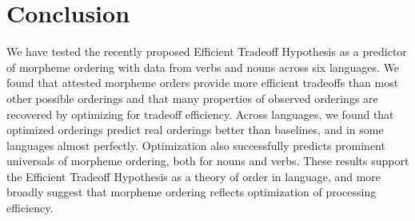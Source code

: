 \documentclass[man]{apa7}
\begin{document}
\section{Conclusion}

We have tested the recently proposed Efficient Tradeoff Hypothesis as a predictor of morpheme ordering with data from verbs and nouns across six languages.
We found that attested morpheme orders provide more efficient tradeoffs than most other possible orderings and that many properties of observed orderings are recovered by optimizing for tradeoff efficiency.
Across languages, we found that optimized orderings predict real orderings better than baselines, and in some languages almost perfectly.
Optimization also successfully predicts prominent universals of morpheme ordering, both for nouns and verbs.
These results support the Efficient Tradeoff Hypothesis as a theory of order in language, and more broadly suggest that morpheme ordering reflects optimization of processing efficiency.


\renewcommand{\bibsection}{\section*{References}}

\printbibliography
\end{document}
